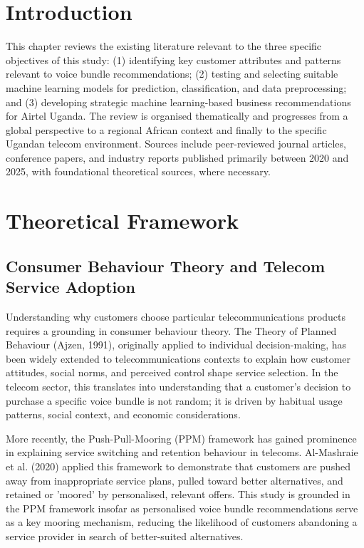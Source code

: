 
\section{Introduction}

This chapter reviews the existing literature relevant to the three specific objectives of this study: (1) identifying key customer attributes and patterns relevant to voice bundle recommendations; (2) testing and selecting suitable machine learning models for prediction, classification, and data preprocessing; and (3) developing strategic machine learning-based business recommendations for Airtel Uganda. The review is organised thematically and progresses from a global perspective to a regional African context and finally to the specific Ugandan telecom environment. Sources include peer-reviewed journal articles, conference papers, and industry reports published primarily between 2020 and 2025, with foundational theoretical sources, where necessary.


\section{Theoretical Framework}


\subsection{Consumer Behaviour Theory and Telecom Service Adoption}

Understanding why customers choose particular telecommunications products requires a grounding in consumer behaviour theory. The Theory of Planned Behaviour (Ajzen, 1991), originally applied to individual decision-making, has been widely extended to telecommunications contexts to explain how customer attitudes, social norms, and perceived control shape service selection. In the telecom sector, this translates into understanding that a customer's decision to purchase a specific voice bundle is not random; it is driven by habitual usage patterns, social context, and economic considerations.

More recently, the Push-Pull-Mooring (PPM) framework has gained prominence in explaining service switching and retention behaviour in telecoms. Al-Mashraie et al. (2020) applied this framework to demonstrate that customers are pushed away from inappropriate service plans, pulled toward better alternatives, and retained or 'moored' by personalised, relevant offers. This study is grounded in the PPM framework insofar as personalised voice bundle recommendations serve as a key mooring mechanism, reducing the likelihood of customers abandoning a service provider in search of better-suited alternatives.

